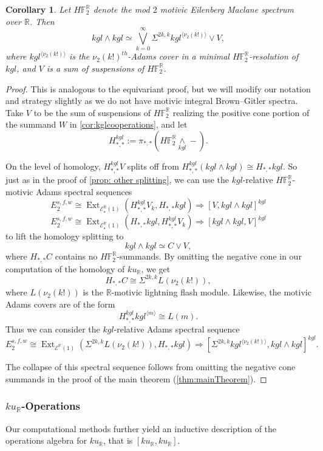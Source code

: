 \documentclass{amsart}
\newtheorem{cor}[equation]{Corollary}
\theoremstyle{plain}
\numberwithin{equation}{section}
\numberwithin{figure}{section}
\DeclareMathOperator{\Ext}{Ext}
\newcommand{\mF}{{\mathbb F}}
\newcommand{\mR}{{\mathbb R}}
\newcommand{\cE}{{\mathcal E}}
\newcommand{\0}{\langle 0 \rangle }
\begin{document}
\begin{cor}
Let $H\mF_{2}^{\mR}$ denote the mod $2$ motivic Eilenberg Maclane spectrum over $\mR$. Then \[kgl \wedge kgl \simeq \bigvee\limits_{k=0}^{\infty} \Sigma^{2k,k}kgl^{\langle \nu_{2}(k!) \rangle} \vee V,\]
where $kgl^{\langle \nu_{2}(k!) \rangle}$ is the $\nu_{2}(k!)^{th}$-Adams cover in a minimal $H\mF_{2}^{\mR}$-resolution of $kgl$, and $V$ is a sum of suspensions of $H\mF_{2}^{\mR}$.
\end{cor}
\begin{proof}
    This is analogous to the equivariant proof, but we will modify our notation and strategy slightly as we do not have motivic integral Brown--Gitler spectra. Take $V$ to be the sum of suspensions of $H \mF_2^\mR$ realizing the positive cone portion of the summand $W$ in \cref{cor:kglcooperations}, and let 
    \[
    H_{*,*}^{kgl}:=\pi_{*,*}\left(H\mF_{2}^{\mR} \underset{kgl}{\wedge}-\right).
    \]
    
    On the level of homology, $H_{*,*}^{kgl}V$ splits off from $H_{*,*}^{kgl}\left(kgl \wedge kgl\right) \cong H_{*,*}kgl$. So just as in the proof of \cref{prop: other splitting}, we can use the $kgl$-relative $H\mF_{2}^{\mR}$-motivic Adams spectral sequences
    \[ E_{2}^{s,f,w} \cong \Ext_{\cE^{\mR}_\star (1)}\left(H_{*,*}^{kgl}V_{k}, H_{*,*}kgl \right) \Longrightarrow [V, kgl \wedge kgl ]^{kgl} \]
\[ E_{2}^{s,f,w} \cong \Ext_{\cE_\star^{\mR}(1)}\left(H_{*,*}kgl, H_{*,*}^{kgl}V_{k} \right) \Longrightarrow [ kgl \wedge kgl, V ]^{kgl} \]
to lift the homology splitting to 
\[kgl \wedge kgl \simeq C \vee V,\]
where $H_{*,*}C$ contains no $H \mF_2^\mR$-summands. By omitting the negative cone in our computation of the homology of $ku_{\mR}$, we get 
\[
H_{*,*}C \cong \Sigma^{2k,k}L(\nu_{2}(k!)),
\]
where $L(\nu_{2}(k!))$ is the $\mR$-motivic lightning flash module. Likewise, the motivic Adams covers are of the form \[H_{*,*}^{kgl}kgl^{\langle m \rangle} \cong L(m).\] Thus we can consider the $kgl$-relative Adams spectral sequence
 \[ E_{2}^{s,f,w} \cong \Ext_{\cE^{\mR}(1)}\left(\Sigma^{2k,k}L(\nu_{2}(k!)), H_{*,*}kgl \right) \Longrightarrow [\Sigma^{2k,k}kgl^{\langle \nu_{2}(k!) \rangle}, kgl \wedge kgl ]^{kgl} .\]

The collapse of this spectral sequence follows from omitting the negative cone summands in the proof of the main theorem (\cref{thm:mainTheorem}).
\end{proof}

\subsubsection{$ku_\mR$-Operations} Our computational methods further yield an inductive description of the operations algebra for $ku_\mR$, that is $[ku_\mR, ku_\mR]$.
\end{document}
